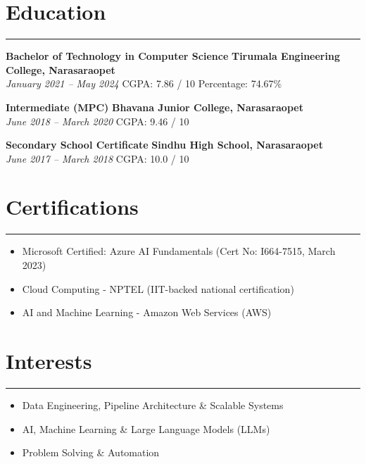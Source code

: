 \documentclass[12pt]{article}
\begin{document}
\section*{Education}
\vspace{1pt}\hrule\vspace{4pt}
\textbf{Bachelor of Technology in Computer Science} \hfill \textbf{Tirumala Engineering College, Narasaraopet} \\
\textit{January 2021 -- May 2024} \quad CGPA: 7.86 / 10 \quad Percentage: 74.67\%

\textbf{Intermediate (MPC)} \hfill \textbf{Bhavana Junior College, Narasaraopet} \\
\textit{June 2018 -- March 2020} \quad CGPA: 9.46 / 10

\textbf{Secondary School Certificate} \hfill \textbf{Sindhu High School, Narasaraopet} \\
\textit{June 2017 -- March 2018} \quad CGPA: 10.0 / 10

\vspace{6pt}

\section*{Certifications}
\vspace{1pt}\hrule\vspace{4pt}
\begin{itemize}
  \item Microsoft Certified: Azure AI Fundamentals (Cert No: I664-7515, March 2023)
  \item Cloud Computing - NPTEL (IIT-backed national certification)
  \item AI and Machine Learning - Amazon Web Services (AWS)
\end{itemize}

\section*{Interests}
\vspace{1pt}\hrule\vspace{4pt}
\begin{itemize}
  \item Data Engineering, Pipeline Architecture \& Scalable Systems
  \item AI, Machine Learning \& Large Language Models (LLMs)
  \item Problem Solving \& Automation
\end{itemize}
\end{document}
